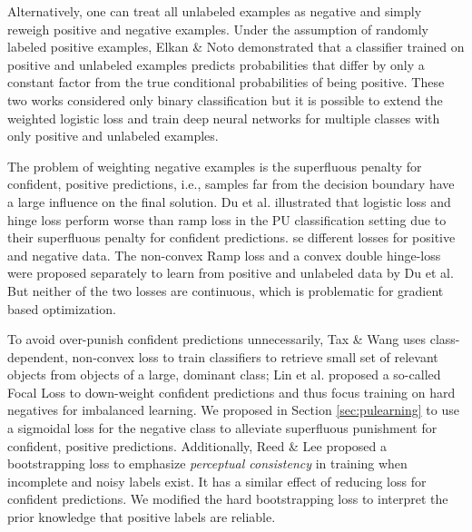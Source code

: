 Alternatively, one can treat all unlabeled examples as negative and simply reweigh positive and negative examples. \cite{lee2003learning}
Under the assumption of randomly labeled positive examples, Elkan \& Noto \cite{elkan2008learning} demonstrated that a classifier trained on positive and unlabeled examples predicts probabilities that differ by only a constant factor from the true conditional probabilities of being positive.
These two works considered only binary classification but it is possible to extend the weighted logistic loss and train deep neural networks for multiple classes with only positive and unlabeled examples.

The problem of weighting negative examples is the superfluous penalty for confident, positive predictions, i.e., samples far from the decision boundary have a large influence on the final solution. \cite{tax2016class}
Du et al. \cite{du2015convex} illustrated that logistic loss and hinge loss perform worse than ramp loss in the PU classification setting due to their superfluous penalty for confident predictions.
se different losses for positive and negative data.
The non-convex Ramp loss \cite{du2014analysis} and a convex double hinge-loss \cite{du2015convex} were proposed separately to learn from positive and unlabeled data by Du et al.
But neither of the two losses are continuous, which is problematic for gradient based optimization.

To avoid over-punish confident predictions unnecessarily, Tax \& Wang \cite{tax2016class} uses class-dependent, non-convex loss to train classifiers to retrieve small set of relevant objects from objects of a large, dominant class;
Lin et al. \cite{lin2017focal} proposed a so-called Focal Loss to down-weight confident predictions and thus focus training on hard negatives for imbalanced learning.
We proposed in Section \ref{sec:pulearning} to use a sigmoidal loss for the negative class to alleviate superfluous punishment for confident, positive predictions.
Additionally, Reed \& Lee \cite{reed2014training} proposed a bootstrapping loss to emphasize \textit{perceptual consistency} in training when incomplete and noisy labels exist.
It has a similar effect of reducing loss for confident predictions.
We modified the hard bootstrapping loss to interpret the prior knowledge that positive labels are reliable.
